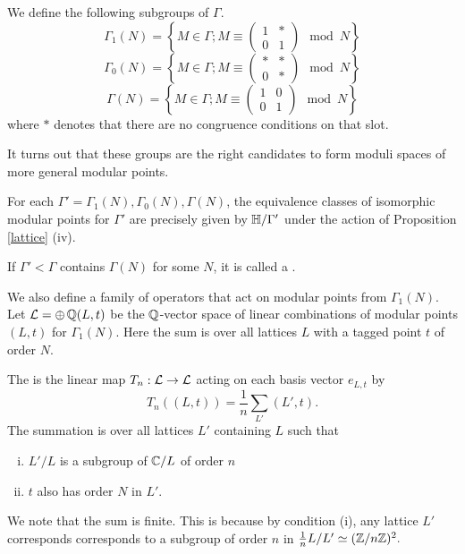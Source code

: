 \documentclass[12pt, a4paper]{report}
\begin{document}
\begin{defn}
  We define the following subgroups of $\Gamma$.
  \[\Gamma_1(N) = \left\{ 
    M \in \Gamma ; M \equiv
    \left(  
    \begin{array}{ccc}
      1 & * \\ 0 & 1
    \end{array} \right) \mod{N} \right\} 
\]
  \[\Gamma_0(N) = \left\{ 
    M \in \Gamma ; M \equiv
    \left(  
    \begin{array}{ccc}
      * & * \\ 0 & *
    \end{array} \right) \mod{N} \right\} 
\]
  \[\Gamma(N) = \left\{ 
    M \in \Gamma ; M \equiv
    \left(  
    \begin{array}{ccc}
      1 & 0 \\ 0 & 1
    \end{array} \right) \mod{N} \right\} 
\]
where $*$ denotes that there are no congruence conditions on that slot.
\end{defn}

It turns out that these groups are the right candidates to form moduli spaces of
more general modular points.

\begin{prop}
  For each $\Gamma' = \Gamma_1(N), \Gamma_0(N), \Gamma(N)$, the equivalence
  classes of isomorphic modular points for $\Gamma'$ are precisely given by
  $\mathbb{H}/\Gamma'$ under the action of Proposition \autoref{lattice} (iv).
\end{prop}
If $\Gamma' < \Gamma$ contains $\Gamma(N)$ for some $N$, it is called a
.

We also define a family of operators that act on modular points from
$\Gamma_1(N)$. Let $\mathcal{L} = \oplus \, {\mathbb Q} (L,t)$ be the ${\mathbb Q}$-vector space
of linear combinations of modular points $(L,t)$ for $\Gamma_1(N).$ Here the sum is over
all lattices $L$ with a tagged point $t$ of order $N$.

\begin{defn} \label{hecke}
  The  is the linear map $T_n : \mathcal{L} \rightarrow \mathcal{L}$ acting
  on each basis vector $e_{L,t}$ by
  \[T_n((L,t)) = \frac{1}{n} \sum\limits_{L'} (L',t).\]
  The summation is over all lattices $L'$ containing $L$ such that
  \begin{enumerate}[(i)]
  \item $L'/L$ is a subgroup of ${\mathbb C}/L$ of order $n$
  \item $t$ also has order $N$ in $L'$.
  \end{enumerate}
  We note that the sum is finite. This is because by condition (i), any lattice $L'$
  corresponds corresponds to a subgroup
  of order $n$ in $\frac{1}{n} L/L' \simeq ({\mathbb Z}/n{\mathbb Z})^2.$
\end{defn}
\end{document}
